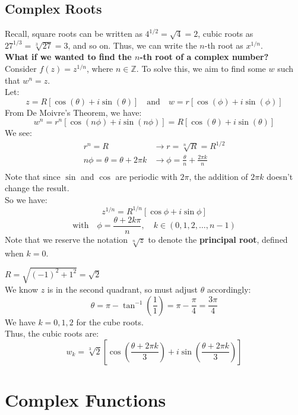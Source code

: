 \documentclass[a4paper,12pt]{article} %
\theoremstyle{definition}
\theoremstyle{plain}
\begin{document}
\subsection{Complex Roots}
Recall, square roots can be written as $4^{1/2} = \sqrt{4} = 2$, cubic roots as $27^{1/3} = \sqrt[3]{27} = 3$, and so on. Thus, we can write the $n$-th root as $x^{1/n}$. \\
\textbf{What if we wanted to find the $n$-th root of a complex number?} \\
Consider $f(z) = z^{1/n}$, where $n\in \mathbb{Z}$. To solve this, we aim to find some $w$ such that $w^n = z$. \\
Let:
$$z = R[\cos(\theta) + i \sin( \theta)] \quad \text{and} \quad w = r[\cos(\phi) + i \sin(\phi)]$$
From De Moivre's Theorem, we have:
$$w^n = r^n[\cos(n\phi) + i\sin(n\phi)] = R[\cos(\theta) + i\sin(\theta)]$$
We see:
\begin{align*}
  r^n = R                          & \rightarrow r = \sqrt[n]{R} = R^{1/2}                  \\
  n\phi = \theta = \theta + 2\pi k & \rightarrow \phi = \frac{\theta}{n} + \frac{2\pi k}{n} \\
\end{align*}
Note that since $\sin$ and $\cos$ are periodic with $2\pi$, the addition of $2\pi k$ doesn't change the result.\\
So we have:
$$z^{1/n} = R^{1/n} [\cos\phi + i \sin\phi]$$
$$\text{with} \quad \phi = \frac{\theta+ 2k\pi}{n}, \quad k \in (0, 1, 2, \dots, n-1)$$
Note that we reserve the notation $\sqrt[n]{z}$ to denote the \textbf{principal root}, defined when $k = 0$.

\begin{examplebox}[Find the cube roots of $z = -1 + i$]
  $R = \sqrt{(-1)^2 + 1^2} = \sqrt{2}$ \\
  We know $z$ is in the second quadrant, so must adjust $\theta$ accordingly:
  $$\theta = \pi - \tan^{-1}\left(\frac{1}{1}\right) = \pi - \frac{\pi}{4} = \frac{3\pi}{4}$$
  We have $k = 0,1,2$ for the cube roots. \\
  Thus, the cubic roots are:
  $$w_k = \sqrt[3]{2} \left[\cos\left(\frac{\theta + 2\pi k}{3}\right) + i\sin\left(\frac{\theta + 2\pi k}{3}\right)\right]$$
\end{examplebox}
\pagebreak
\section{Complex Functions}
\end{document}
